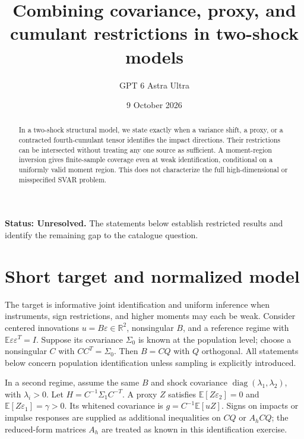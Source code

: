 \documentclass[11pt,a4paper]{article}
\title{Combining covariance, proxy, and cumulant restrictions in two-shock models}
\author{GPT 6 Astra Ultra}
\date{9 October 2026}
\theoremstyle{definition}
\theoremstyle{remark}
\newcommand{\R}{\mathbb{R}}
\newcommand{\E}{\mathbb{E}}
\DeclareMathOperator{\diag}{diag}
\begin{document}
\maketitle
\textbf{Status: Unresolved.} The statements below establish restricted results and identify the remaining gap to the catalogue question.

\begin{abstract}
In a two-shock structural model, we state exactly when a variance shift, a proxy, or a contracted fourth-cumulant tensor identifies the impact directions. Their restrictions can be intersected without treating any one source as sufficient. A moment-region inversion gives finite-sample coverage even at weak identification, conditional on a uniformly valid moment region. This does not characterize the full high-dimensional or misspecified SVAR problem.
\end{abstract}
\section{Short target and normalized model}
The target is informative joint identification and uniform inference when instruments, sign restrictions, and higher moments may each be weak. Consider centered innovations $u=B\varepsilon\in\R^2$, nonsingular $B$, and a reference regime with $\E\varepsilon\varepsilon^T=I$. Suppose its covariance $\Sigma_0$ is known at the population level; choose a nonsingular $C$ with $CC^T=\Sigma_0$. Then $B=CQ$ with $Q$ orthogonal. All statements below concern population identification unless sampling is explicitly introduced.

In a second regime, assume the same $B$ and shock covariance $\diag(\lambda_1,\lambda_2)$, with $\lambda_i>0$. Let $H=C^{-1}\Sigma_1C^{-T}$. A proxy $Z$ satisfies $\E[Z\varepsilon_2]=0$ and $\E[Z\varepsilon_1]=\gamma>0$. Its whitened covariance is $g=C^{-1}\E[uZ]$. Signs on impacts or impulse responses are supplied as additional inequalities on $CQ$ or $A_hCQ$; the reduced-form matrices $A_h$ are treated as known in this identification exercise.
\end{document}
